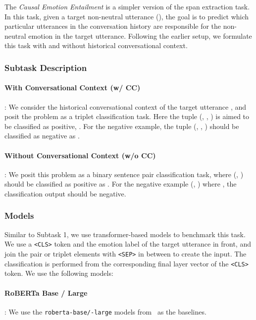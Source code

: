 \documentclass[11pt,a4paper]{article}
\theoremstyle{definition}
\newcommand\code[1]{\texttt{#1}}
\begin{document}
The \textit{Causal Emotion Entailment} is a simpler version of the span extraction task. In this task, given a target non-neutral utterance (), the goal is to predict which particular utterances in the conversation history  are responsible for the non-neutral emotion in the target utterance. Following the earlier setup, we formulate this task with and without historical conversational context.

\subsubsection{Subtask Description}

\paragraph{With Conversational Context (w/ CC)}:
We consider the historical conversational context  of the target utterance , and posit the problem as a triplet classification task. Here the tuple (, , ) is aimed to be classified as positive, . For the negative example, the tuple (, , ) should be classified as negative as .

\paragraph{Without Conversational Context (w/o CC)}:
We posit this problem as a binary sentence pair classification task, where (, ) should be classified as positive as . For the negative example (, ) where , the classification output should be negative.



\subsubsection{Models}
Similar to Subtask 1, we use transformer-based models to benchmark this task. We use a \code{<CLS>} token and the emotion label  of the target utterance  in front, and join the pair or triplet elements with \code{<SEP>} in between to create the input. 
The classification is performed from the corresponding final layer vector of the \code{<CLS>} token. We use the following models:

\paragraph{RoBERTa Base / Large}: We use the \code{roberta-base/-large} models from~\citep{liu2019roberta} as the baselines.
\end{document}
